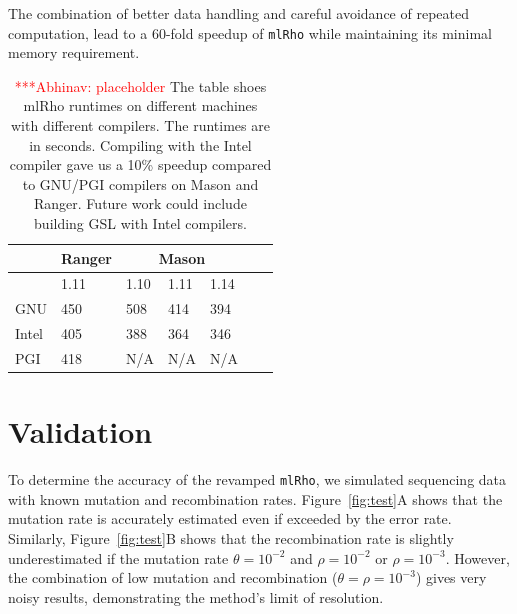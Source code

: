 \documentclass{sig-alternate}
\newcommand{\abhi}[1]{ {\textcolor{red} { ***Abhinav: #1 }}}
\newcommand{\abhi}[1]{ {}}
\newcommand{\ty}{\texttt}
\begin{document}
The combination of better data handling and careful avoidance of
repeated computation, lead to a 60-fold speedup of \ty{mlRho} while
maintaining its minimal memory requirement.
\begin{table}
\centering
\begin{tabular}{| l  | l  | l  | l  | l  | l  | l  |} \hline
	&Ranger & \multicolumn{3}{|c|}{Mason}\\ \hline
	& 1.11  & 1.10&1.11 & 1.14\\ \hline
GNU & 450 & 508 & 414 & 394   \\
\hline
Intel & 405 & 388 & 364 & 346\\
\hline
PGI &418 & N/A   & N/A &N/A\\
\hline

\end{tabular}
\caption{\abhi{placeholder}The table shoes mlRho runtimes on different machines with different compilers. The runtimes are in seconds. Compiling with the Intel compiler gave us a 10\% speedup compared to GNU/PGI compilers on Mason and Ranger. Future work could include building GSL with Intel compilers.   } 
\label{table:cache_comp}
\end{table}

\section{Validation}
To determine the accuracy of the revamped \ty{mlRho}, we simulated
sequencing data with known mutation and recombination
rates. Figure~\ref{fig:test}A shows that the mutation rate is
accurately estimated even if exceeded by the error
rate. Similarly, Figure~\ref{fig:test}B shows that the recombination rate is
slightly underestimated if the mutation rate $\theta=10^{-2}$ and
$\rho=10^{-2}$ or $\rho=10^{-3}$. However, the combination of low
mutation and recombination ($\theta=\rho=10^{-3}$) gives very noisy
results, demonstrating the method's limit of resolution.

\end{document}
